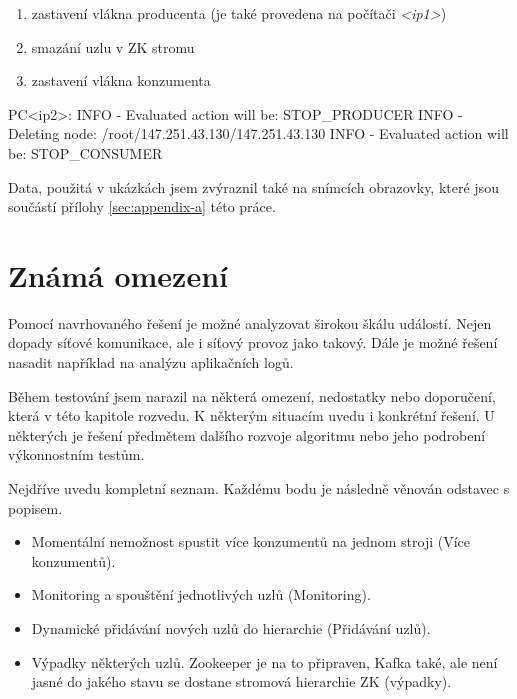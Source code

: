 \documentclass[
  digital, %
  table,   %
  nolof,     %
  nolot,     %
  oneside, %
  nocover,
  monochrome,
  12pt
]{fithesis3}
\begin{document}
\begin{enumerate}
  \item zastavení vlákna producenta (je také provedena na počítači \textit{<ip1>})
  \item smazání uzlu v ZK stromu
  \item zastavení vlákna konzumenta
\end{enumerate}

\begin{center}
\begin{minipage}[H]{\linewidth}
	\begin{mylisting}
PC<ip2>:
INFO - Evaluated action will be: STOP_PRODUCER
INFO - Deleting node: /root/147.251.43.130/147.251.43.130
INFO - Evaluated action will be: STOP_CONSUMER
	\end{mylisting}
	\label{fig:clean-up-example}
\end{minipage}
\end{center}

Data, použitá v ukázkách jsem zvýraznil také na snímcích obrazovky, které jsou součástí přílohy \ref{sec:appendix-a} této práce.


\section{Známá omezení}
\label{sec:omezeni}
Pomocí navrhovaného řešení je možné analyzovat širokou škálu událostí. Nejen dopady síťové komunikace, ale i síťový provoz jako takový. Dále je možné řešení nasadit například na analýzu aplikačních logů.

Během testování jsem narazil na některá omezení, nedostatky nebo doporučení, která v této kapitole rozvedu. K některým situacím uvedu i konkrétní řešení. U některých je řešení předmětem dalšího rozvoje algoritmu nebo jeho podrobení výkonnostním testům.

Nejdříve uvedu kompletní seznam. Každému bodu je následně věnován odstavec s popisem.

\begin{itemize}
	\item Momentální nemožnost spustit více konzumentů na jednom stroji (Více konzumentů).
	\item Monitoring a spouštění jednotlivých uzlů (Monitoring).
	\item Dynamické přidávání nových uzlů do hierarchie (Přidávání uzlů).
	\item Výpadky některých uzlů. Zookeeper je na to připraven, Kafka také, ale není jasné do jakého stavu se dostane stromová hierarchie ZK (výpadky).
\end{itemize}
\end{document}
